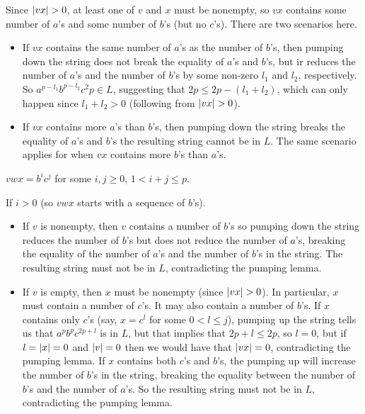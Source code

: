 \begin{problem}
\begin{enumalph}
\begin{Answer}
\begin{enumroman}
          \step
          Since $\lvert vx\rvert > 0$, at least one of $v$ and $x$ must be nonempty,
          so $vx$ contains some number of $a$'s and some number of $b$'s
          (but no $c$'s).
          There are two scenarios here.
          \begin{itemize}
            \item If $vx$ contains the same number of $a$'s as the number of $b$'s,
              then pumping down the string does not break the equality of $a$'s
              and $b$'s, but ir reduces the number of $a$'s and the number of $b$'s
              by some non-zero $l_1$ and $l_2$, respectively.
              So $a^{p-l_1}b^{p-l_2}c^2p \in L$,
              suggesting that $2p \leq 2p - (l_1 + l_2)$, which can only happen
              since $l_1 + l_2 > 0$ (following from $\lvert vx\rvert > 0$).
            \item If $vx$ contains more $a$'s than $b$'s, then pumping down the string
              breaks the equality of $a$'s and $b$'s the resulting string cannot
              be in $L$. The same scenario applies for when $vx$ contains more
              $b$'s than $a$'s.
          \end{itemize}
        \item $vwx = b^ic^j$ for some $i, j \geq 0$, $1 < i + j \leq p$.
        
        If $i > 0$ (so $vwx$ starts with a sequence of $b$'s).
        \begin{itemize}
          \item If $v$ is nonempty, then $v$ contains a number of $b$'s
            so pumping down the string reduces the number of $b$'s
            but does not reduce the number of $a$'s,
            breaking the equality of the number of $a$'s and the number of $b$'s
            in the string. The resulting string must not be in $L$,
            contradicting the pumping lemma.
          \item If $v$ is empty, then $x$ must be nonempty (since $\lvert vx\rvert > 0$).
            In particular, $x$ must contain a number of $c$'s. It may also contain
            a number of $b$'s.
            If $x$ contains only $c$'s (say, $x = c^l$ for some $0 < l \leq j$),
            pumping up the string tells us that $a^pb^pc^{2p+l}$
            is in $L$, but that implies that $2p + l \leq 2p$,
            so $l = 0$, but if $l = \lvert x\rvert = 0$ and $\lvert v\rvert = 0$
            then we would have that $\lvert vx\rvert = 0$, contradicting the pumping lemma.
            If $x$ contains both $c$'s and $b$'s, the pumping up will increase the number
            of $b$'s in the string, breaking the equality between the number of $b$'s
            and the number of $a$'s. So the resulting string must not be in $L$,
            contradicting the pumping lemma.
        \end{itemize}


\end{enumroman}
\end{Answer}
\end{enumalph}
\end{problem}
